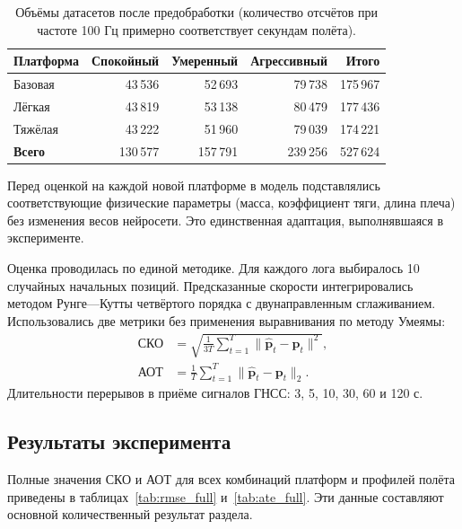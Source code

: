 \begin{table}[htbp]
	\centering
	\caption{Объёмы датасетов после предобработки (количество отсчётов при частоте 100 Гц примерно соответствует секундам полёта).}
	\label{tab:dataset_sizes}
	\begin{tabular}{lrrrr}
		\toprule
		\textbf{Платформа} & \textbf{Спокойный} & \textbf{Умеренный} &
		\textbf{Агрессивный} & \textbf{Итого} \\
		\midrule
		Базовая        & 43\,536 & 52\,693 & 79\,738 & 175\,967 \\
		Лёгкая & 43\,819 & 53\,138 & 80\,479 & 177\,436 \\
		Тяжёлая & 43\,222 & 51\,960 & 79\,039 & 174\,221 \\
		\midrule
		\textbf{Всего}       & 130\,577 & 157\,791 & 239\,256 & 527\,624 \\
		\bottomrule
	\end{tabular}
\end{table}

Перед оценкой на каждой новой платформе в модель подставлялись соответствующие физические параметры (масса, коэффициент тяги, длина плеча) без изменения весов нейросети. Это единственная адаптация, выполнявшаяся в эксперименте.

Оценка проводилась по единой методике. Для каждого лога выбиралось 10 случайных начальных позиций. Предсказанные скорости интегрировались методом Рунге—Кутты четвёртого порядка с двунаправленным сглаживанием. Использовались две метрики без применения выравнивания по методу Умеямы:
\begin{align}
	\text{СКО} &= \sqrt{\frac{1}{3T}\sum_{t=1}^{T}\|\hat{\mathbf{p}}_t - \mathbf{p}_t\|^2}, \\
	\text{АОТ} &= \frac{1}{T}\sum_{t=1}^{T}\|\hat{\mathbf{p}}_t - \mathbf{p}_t\|_2.
\end{align}
Длительности перерывов в приёме сигналов ГНСС: 3, 5, 10, 30, 60 и 120 с.

\subsection{Результаты эксперимента}

Полные значения СКО и АОТ для всех комбинаций платформ и профилей полёта приведены в таблицах~\ref{tab:rmse_full} и~\ref{tab:ate_full}. Эти данные составляют основной количественный результат раздела.


